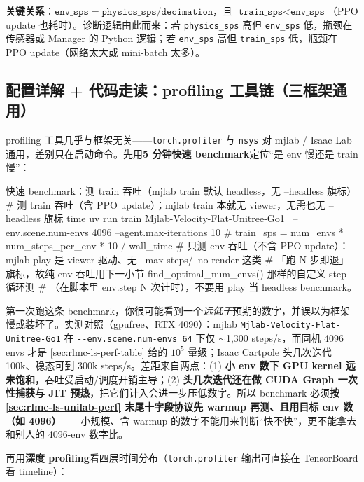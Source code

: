 \textbf{关键关系}：$\texttt{env\_sps}=\texttt{physics\_sps}/\texttt{decimation}$，且 $\texttt{train\_sps}<\texttt{env\_sps}$（PPO update 也耗时）。诊断逻辑由此而来：若 \verb|physics_sps| 高但 \verb|env_sps| 低，瓶颈在传感器或 Manager 的 Python 逻辑；若 \verb|env_sps| 高但 \verb|train_sps| 低，瓶颈在 PPO update（网络太大或 mini-batch 太多）。

\subsection{配置详解 + 代码走读：profiling 工具链（三框架通用）}
\label{sec:rlmc-ls-profiling}

profiling 工具几乎与框架无关——\verb|torch.profiler| 与 \verb|nsys| 对 mjlab / Isaac Lab 通用，差别只在启动命令。先用\textbf{5 分钟快速 benchmark}定位“是 env 慢还是 train 慢”：

\begin{codebox}[bash]{快速 benchmark：测 train 吞吐（mjlab train 默认 headless，无 --headless 旗标）}
# 测 train 吞吐（含 PPO update）；mjlab train 本就无 viewer，无需也无 --headless 旗标
time uv run train Mjlab-Velocity-Flat-Unitree-Go1 \
    --env.scene.num-envs 4096 --agent.max-iterations 10
#   train_sps = num_envs * num_steps_per_env * 10 / wall_time
# 只测 env 吞吐（不含 PPO update）：mjlab play 是 viewer 驱动、无 --max-steps/--no-render 这类
#   「跑 N 步即退」旗标，故纯 env 吞吐用下一小节 find_optimal_num_envs() 那样的自定义 step 循环测
#   （在脚本里 env.step N 次计时），不要用 play 当 headless benchmark。
\end{codebox}

\begin{note}
第一次跑这条 benchmark，你很可能看到一个\emph{远低于}预期的数字，并误以为框架慢或装坏了。实测对照（gpufree、RTX 4090）：mjlab \texttt{Mjlab-Velocity-Flat-Unitree-Go1} 在 \verb|--env.scene.num-envs 64| 下仅 $\sim$1{,}300 steps/s，而同机 4096 envs 才是 \cref{sec:rlmc-ls-perf-table} 给的 $10^5$ 量级；Isaac Cartpole 头几次迭代 100k、稳态可到 300k steps/s。差距来自两点：(1) \textbf{小 env 数下 GPU kernel 远未饱和}，吞吐受启动/调度开销主导；(2) \textbf{头几次迭代还在做 CUDA Graph 一次性捕获与 JIT 预热}，把它们计入会进一步压低数字。所以 benchmark 必须\textbf{按 \cref{sec:rlmc-ls-unilab-perf} 末尾十字段协议先 warmup 再测、且用目标 env 数（如 4096）}——小规模、含 warmup 的数字不能用来判断“快不快”，更不能拿去和别人的 4096-env 数字比。
\end{note}

再用\textbf{深度 profiling}看四层时间分布（\verb|torch.profiler| 输出可直接在 TensorBoard 看 timeline）：

